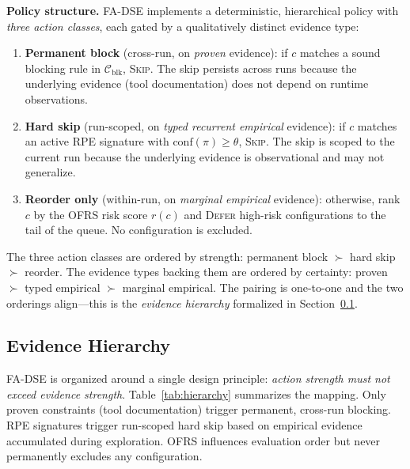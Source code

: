 \documentclass[journal]{IEEEtran}
\begin{document}
\textbf{Policy structure.} FA-DSE implements a deterministic, hierarchical policy with \emph{three action classes}, each gated by a qualitatively distinct evidence type:
\begin{enumerate}
    \item \textbf{Permanent block} (cross-run, on \emph{proven} evidence): if $c$ matches a sound blocking rule in $\mathcal{C}_{\text{blk}}$, \textsc{Skip}. The skip persists across runs because the underlying evidence (tool documentation) does not depend on runtime observations.
    \item \textbf{Hard skip} (run-scoped, on \emph{typed recurrent empirical} evidence): if $c$ matches an active RPE signature with $\text{conf}(\pi) \geq \theta$, \textsc{Skip}. The skip is scoped to the current run because the underlying evidence is observational and may not generalize.
    \item \textbf{Reorder only} (within-run, on \emph{marginal empirical} evidence): otherwise, rank $c$ by the OFRS risk score $r(c)$ and \textsc{Defer} high-risk configurations to the tail of the queue. No configuration is excluded.
\end{enumerate}
The three action classes are ordered by strength: permanent block $\succ$ hard skip $\succ$ reorder. The evidence types backing them are ordered by certainty: proven $\succ$ typed empirical $\succ$ marginal empirical. The pairing is one-to-one and the two orderings align---this is the \emph{evidence hierarchy} formalized in Section~\ref{sec:hierarchy}.

\subsection{Evidence Hierarchy}
\label{sec:hierarchy}

FA-DSE is organized around a single design principle: \emph{action strength must not exceed evidence strength}. Table~\ref{tab:hierarchy} summarizes the mapping. Only proven constraints (tool documentation) trigger permanent, cross-run blocking. RPE signatures trigger run-scoped hard skip based on empirical evidence accumulated during exploration. OFRS influences evaluation order but never permanently excludes any configuration.

\begin{table}[t]
\centering
\caption{FA-DSE Evidence Hierarchy}
\label{tab:hierarchy}
\end{table}
\end{document}
